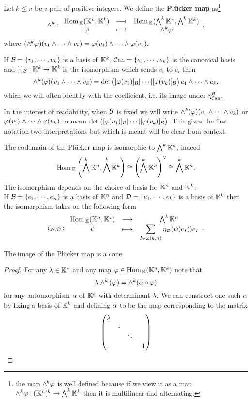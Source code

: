 \begin{definition}
Let $k\leq n$ be a pair of positive integers. We define the \textbf{Pl\"ucker map} as\footnote{the map $\wedge^k\varphi$ is well defined because if we view it as a map $\wedge^k\varphi:(\mathbb{K}^n)^k\to \bigwedge^k\mathbb{K}^k$ then it is multilinear and alternating.}
\[\wedge^k:\begin{array}{ccc} {\mathrm{Hom}\,_{\mathbb{K}}(\mathbb{K}^n,\mathbb{K}^k)} & \longrightarrow & {\mathrm{Hom}\,_{\mathbb{K}}(\bigwedge^k\mathbb{K}^n,\bigwedge^k\mathbb{K}^k)}\\ {\varphi} & \longmapsto & {\wedge^k\varphi} \end{array},\]
where $(\wedge^k\varphi)(v_1\wedge\cdots\wedge v_k)=\varphi(v_1)\wedge\cdots\wedge\varphi(v_k).$
\end{definition}

\begin{remark}
If $\mathcal{B}=\left\{{v_1,\cdots, v_k}\right\}$ is a basis of $\mathbb{K}^k$, ${\mathcal{C}\mathrm{an}}=\left\{{e_1,\cdots,e_k}\right\}$ is the canonical basis and $[\cdot]_{\mathcal{B}}:\mathbb{K}^k\to\mathbb{K}^k$ is the isomorphism which sends $v_i$ to $e_i$ then
\[\wedge^k(\varphi)(v_1\wedge\cdots\wedge v_k)=\det\begin{pmatrix}[\varphi(v_1)]_{\mathcal{B}}|\cdots|[\varphi(v_k)]_{\mathcal{B}}\end{pmatrix} e_1\wedge\cdots\wedge e_k,\]
which we will often identify with the coefficient, i.e. its image under $\eta^{\mathcal{B}}_{\mathcal{C}\mathrm{an}}$.\medskip

\noindent In the interest of readability, when $\mathcal{B}$ is fixed we will write $\wedge^k(\varphi)(v_1\wedge\cdots\wedge v_k)$ or $\varphi(v_1)\wedge\cdots\wedge\varphi(v_k)$ to mean $\det\begin{pmatrix}[\varphi(v_1)]_{\mathcal{B}}|\cdots|[\varphi(v_k)]_{\mathcal{B}}\end{pmatrix}$. This gives the first notation two interpretations but which is meant will be clear from context.
\end{remark}

\begin{remark}\label{CodomainOfPluckerMap}
The codomain of the Pl\"ucker map is isomorphic to $\bigwedge^k\mathbb{K}^n$, indeed
\[\mathrm{Hom}\,_{\mathbb{K}}\left({\bigwedge^k\mathbb{K}^n,\bigwedge^k\mathbb{K}^k}\right)\cong \left({\bigwedge^k\mathbb{K}^n}\right)^{\vee}\cong \bigwedge^k\mathbb{K}^n.\]
The isomorphism depends on the choice of basis for $\mathbb{K}^n$ and $\mathbb{K}^k$:\\
If $\mathcal{B}=\left\{{e_1,\cdots, e_n}\right\}$ is a basis of $\mathbb{K}^n$ and $\mathcal{D}=\left\{{e_1,\cdots, e_k}\right\}$ is a basis of $\mathbb{K}^k$ then the isomorphism takes on the following form
\[\zeta_{\mathcal{B},\mathcal{D}}:\begin{array}{ccc} {\mathrm{Hom}\,_{\mathbb{K}}(\mathbb{K}^n,\mathbb{K}^k)} & \longrightarrow & {\bigwedge^k\mathbb{K}^n}\\ {\psi} & \longmapsto & {\displaystyle\sum_{I\in\omega(k,n)} \eta_{\mathcal{D}}(\psi(e_I))e_I} \end{array}.\]
\end{remark}


\begin{proposition}\label{ImagePluckerMapIsCone}
The image of the Pl\"ucker map is a cone.
\end{proposition}
\begin{proof}
For any $\lambda\in \mathbb{K}^\ast$ and any map $\varphi\in \mathrm{Hom}\,_{\mathbb{K}}(\mathbb{K}^n,\mathbb{K}^k)$ note that
\[\lambda\wedge^k(\varphi)=\wedge^k(\alpha\circ \varphi)\]
for any automorphism $\alpha$ of $\mathbb{K}^k$ with determinant $\lambda$. We can construct one such $\alpha$ by fixing a basis of $\mathbb{K}^k$ and defining $\alpha$ to be the map corresponding to the matrix
\[\begin{pmatrix}
\lambda &   &        &\\
    & 1 &        &\\
	&   & \ddots &\\
	&   &        &  1
\end{pmatrix}\]
\end{proof}


